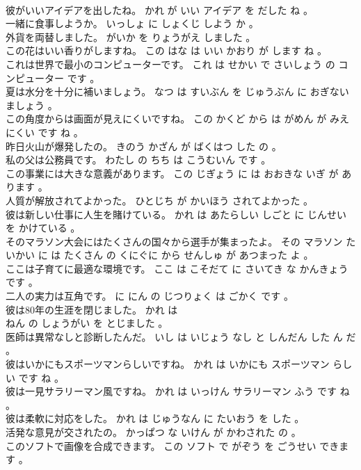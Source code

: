 \documentclass[8pt]{extreport}
\begin{document}
\begin{CJK}{UTF8}{min}
\\	彼がいいアイデアを出したね。	かれ が いい アイデア を だした ね 。 
\\	一緒に食事しようか。	いっしょ に しょくじ しよう か 。 
\\	外貨を両替しました。	がいか を りょうがえ しました 。 
\\	この花はいい香りがしますね。	この はな は いい かおり が します ね 。 
\\	これは世界で最小のコンピューターです。	これ は せかい で さいしょう の コンピューター です 。 
\\	夏は水分を十分に補いましょう。	なつ は すいぶん を じゅうぶん に おぎないましょう 。 
\\	この角度からは画面が見えにくいですね。	この かくど から は がめん が みえにくい です ね 。 
\\	昨日火山が爆発したの。	きのう かざん が ばくはつ した の 。 
\\	私の父は公務員です。	わたし の ちち は こうむいん です 。 
\\	この事業には大きな意義があります。	この じぎょう に は おおきな いぎ が あります 。 
\\	人質が解放されてよかった。	ひとじち が かいほう されてよかった 。 
\\	彼は新しい仕事に人生を賭けている。	かれ は あたらしい しごと に じんせい を かけている 。 
\\	そのマラソン大会にはたくさんの国々から選手が集まったよ。	その マラソン たいかい に は たくさん の くにぐに から せんしゅ が あつまった よ 。 
\\	ここは子育てに最適な環境です。	ここ は こそだて に さいてき な かんきょう です 。 
\\	二人の実力は互角です。	に にん の じつりょく は ごかく です 。 
\\	彼は80年の生涯を閉じました。	かれ は 
\\	ねん の しょうがい を とじました 。 
\\	医師は異常なしと診断したんだ。	いし は いじょう なし と しんだん した ん だ 。 
\\	彼はいかにもスポーツマンらしいですね。	かれ は いかにも スポーツマン らしい です ね 。 
\\	彼は一見サラリーマン風ですね。	かれ は いっけん サラリーマン ふう です ね 。 
\\	彼は柔軟に対応をした。	かれ は じゅうなん に たいおう を した 。 
\\	活発な意見が交されたの。	かっぱつ な いけん が かわされた の 。 
\\	このソフトで画像を合成できます。	この ソフト で がぞう を ごうせい できます 。 

\end{CJK}
\end{document}
